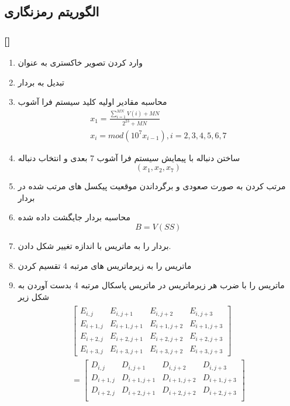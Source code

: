 \documentclass[xcolor=dvipsnames, professionalfonts, 11pt]{beamer}
\newcommand*{\makeframetitle}{\frametitle{\insertsection \hspace{0.1em} {\footnotesize [\insertsubsection]}}}
\begin{document}
\subsection{الگوریتم رمزنگاری}
\begin{frame}[allowframebreaks]
\makeframetitle
\begin{enumerate}
    \item وارد کردن تصویر خاکستری به عنوان 
    \item تبدیل  به بردار 
    \item محاسبه مقادیر اولیه کلید سیستم فرا آشوب
    \begin{align}
        x_1 = \frac{\sum_{i=1}^{MN} V(i) + MN}{2^23 + MN}\\
        x_i = mod(10^7x_{i-1}), i = 2,3,4,5,6,7
    \end{align}
    \item ساختن دنباله  با پیمایش سیستم فرا آشوب 7 بعدی و انتخاب دنباله $$(x_1, x_2, x_7)$$
    \item مرتب کردن  به صورت صعودی و برگرداندن موقعیت پیکسل های مرتب شده در بردار 
    \item محاسبه بردار جایگشت داده شده  $$ B = V(SS) $$
    \item بردار  را به ماتریس  با اندازه  تغییر شکل دادن.
    \item ماتریس  را به زیرماتریس های مرتبه 4 تقسیم کردن
    \item ماتریس  را با ضرب هر زیرماتریس در ماتریس پاسکال مرتبه 4 بدست  آوردن به شکل زیر
    {\footnotesize
    \begin{align}
        \begin{split}
           \begin{bmatrix}
                E_{i,j} & E_{i,j+1} & E_{i,j+2} & E_{i,j+3}\\
                E_{i+1,j} & E_{i+1,j+1} & E_{i+1,j+2} & E_{i+1,j+3}\\
                E_{i+2,j} & E_{i+2,j+1} & E_{i+2,j+2} & E_{i+2,j+3}\\
                E_{i+3,j} & E_{i+3,j+1} & E_{i+3,j+2} & E_{i+3,j+3}
            \end{bmatrix}\\ = 
            \begin{bmatrix}
                D_{i,j} & D_{i,j+1} & D_{i,j+2} & D_{i,j+3}\\
                D_{i+1,j} & D_{i+1,j+1} & D_{i+1,j+2} & D_{i+1,j+3}\\
                D_{i+2,j} & D_{i+2,j+1} & D_{i+2,j+2} & D_{i+2,j+3}\\

\end{bmatrix}
\end{split}
\end{align}}
\end{enumerate}
\end{frame}
\end{document}

